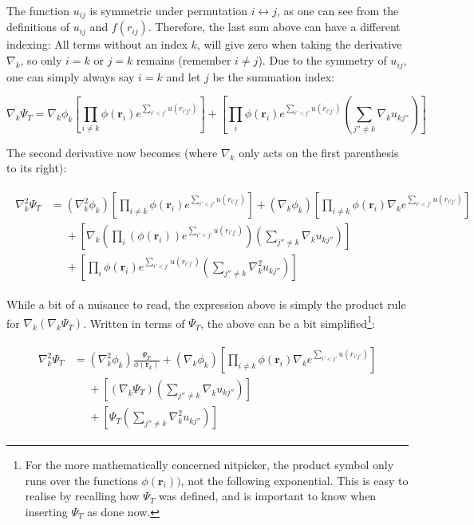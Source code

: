 \documentclass[english, a4paper]{article}
\newcommand{\bm}[1]{\mathbf{#1}}
\begin{document}
The function $u_{ij}$ is symmetric under permutation $i \leftrightarrow j$, as one can see from the definitions of $u_{ij}$ and $f(r_{ij})$. Therefore, the last sum above can have a different indexing: All terms without an index $k$, will give zero when taking the derivative $\nabla_k$, so only $i=k$ or $j=k$ remains (remember $i \neq j$). Due to the symmetry of $u_{ij}$, one can simply always say $i=k$ and let $j$ be the summation index:

\begin{equation}
	\nabla_k\Psi_T = \nabla_k\phi_k\left[\prod_{i\neq k} \phi(\bm{r}_i)e^{\sum_{i'<j'}u(r_{i'j'})}\right] + \left[\prod_i \phi(\bm{r}_i)e^{\sum_{i'<j'}u(r_{i'j'})}\left(\sum_{j''\neq k}\nabla_ku_{kj''} \right)\right]
	\label{eq:grad}
\end{equation}

The second derivative now becomes (where $\nabla_k$ only acts on the first parenthesis to its right):

\begin{align}
	\begin{split}
	\nabla_k^2\Psi_T &= (\nabla_k^2\phi_k)\left[\prod_{i\neq k} \phi(\bm{r}_i)e^{\sum_{i'<j'}u(r_{i'j'})}\right] + (\nabla_k\phi_k) \left[\prod_{i\neq k}\phi(\bm{r}_i)\nabla_ke^{\sum_{i'<j'}u(r_{i'j'})}\right]\\
	&\:\:\:\:\:\: + \left[\nabla_k\left(\prod_i \left(\phi(\bm{r}_i)\right)e^{\sum_{i'<j'}u(r_{i'j'})}\right)\left(\sum_{j''\neq k}\nabla_ku_{kj''} \right)\right]\\
	&\:\:\:\:\:\: + \left[\prod_i \phi(\bm{r}_i)e^{\sum_{i'<j'}u(r_{i'j'})}\left(\sum_{j''\neq k}\nabla_k^2u_{kj''} \right)\right]
	\end{split}
\end{align}

While a bit of a nuisance to read, the expression above is simply the product rule for $\nabla_k(\nabla_k\Psi_T)$. Written in terms of $\Psi_T$, the above can be a bit simplified\footnote{For the more mathematically concerned nitpicker, the product symbol only runs over the functions $\phi(\bm{r}_i))$, not the following exponential. This is easy to realise by recalling how $\Psi_T$ was defined, and is important to know when inserting $\Psi_T$ as done now.}:

\begin{align}
	\begin{split}
	\nabla_k^2\Psi_T &= (\nabla_k^2\phi_k)\frac{\Psi_T}{\phi(\bm{r}_k)} + (\nabla_k\phi_k) \left[\prod_{i\neq k}\phi(\bm{r}_i)\nabla_ke^{\sum_{i'<j'}u(r_{i'j'})}\right]\\
	&\:\:\:\:\:\: + \left[\left(\nabla_k\Psi_T\right)\left(\sum_{j''\neq k}\nabla_ku_{kj''} \right)\right]\\
	&\:\:\:\:\:\: + \left[\Psi_T\left(\sum_{j''\neq k}\nabla_k^2u_{kj''} \right)\right]
	\end{split}
\end{align}
\end{document}
